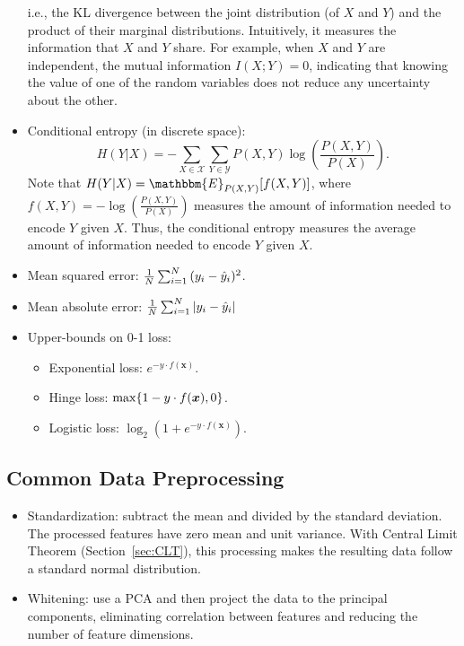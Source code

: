 \begin{itemize}
\begin{equation*}
            \end{equation*}
        i.e., the KL divergence between the joint distribution (of $X$ and $Y$) and the product of their marginal distributions.
        Intuitively, it measures the information that $X$ and $Y$ share. 
        For example, when $X$ and $Y$ are independent, the mutual information $I(X; Y)=0$, indicating that knowing the value of one of the random variables does not reduce any uncertainty about the other.
        \item Conditional entropy (in discrete space):
            \begin{equation*}
                H(Y|X) = - \sum_{X \in \mathcal{X}}^{}{
                    \sum_{Y \in \mathcal{Y}}^{}{
                        P(X, Y) \log\left(\frac{P(X, Y)}{P(X)}\right)
                    }
                }.
            \end{equation*}
        Note that $H(Y|X) = \mathbbm{E}_{P(X, Y)}[f(X, Y)]$, where $f(X, Y)=-\log\left(\frac{P(X, Y)}{P(X)}\right)$ measures the amount of information needed to encode $Y$ given $X$.
        Thus, the conditional entropy measures the average amount of information needed to encode $Y$ given $X$.
        \item Mean squared error: $\frac{1}{N}\sum_{i=1}^{N}{(y_i - \hat{y}_i)^2}$.
        \item Mean absolute error: $\frac{1}{N}\sum_{i=1}^{N}{| y_i - \hat{y}_i |}$
        \item Upper-bounds on 0-1 loss:
            \begin{itemize}
                \item Exponential loss: $e^{-y \cdot f(\bm{x})}$.
                \item Hinge loss: $\max\{ 1 - y \cdot f(\bm{x}), 0 \}$.
                \item Logistic loss: $\log_2\left( 1 + e^{-y \cdot f(\bm{x})}\right)$. 
            \end{itemize}
    \end{itemize}
    

\subsection{Common Data Preprocessing}
    \begin{itemize}
        \item Standardization: subtract the mean and divided by the standard deviation. The processed features have zero mean and unit variance. With Central Limit Theorem (Section~\ref{sec:CLT}), this processing makes the resulting data follow a standard normal distribution.
        \item Whitening: use a PCA and then project the data to the principal components, eliminating correlation between features and reducing the number of feature dimensions. 
    \end{itemize}
    


